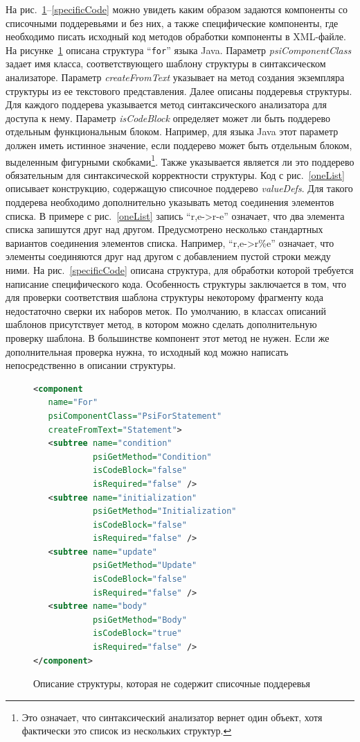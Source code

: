 На рис.~\ref{noLists}--\ref{specificCode} можно увидеть каким образом задаются компоненты со списочными поддеревьями и без них, а также специфические компоненты, где необходимо писать исходный код методов обработки компоненты в XML-файле. На рисунке~\ref{noLists} описана структура ``\lstinline{for}'' языка Java. Параметр \textit{psiComponentClass} задает имя класса, соответствующего шаблону структуры в синтаксическом анализаторе. Параметр \textit{createFromText} указывает на метод создания экземпляра структуры из ее текстового представления. Далее описаны поддеревья структуры. Для каждого поддерева указывается метод синтаксического анализатора для доступа к нему. Параметр \textit{isCodeBlock} определяет может ли быть поддерево отдельным функциональным блоком. Например, для языка Java этот параметр должен иметь истинное значение, если поддерево может быть отдельным блоком, выделенным фигурными скобками\footnote{Это означает, что синтаксический анализатор вернет один объект, хотя фактически это список из нескольких структур.}. Также указывается является ли это поддерево обязательным для синтаксической корректности структуры. Код с рис.~\ref{oneList} описывает конструкцию, содержащую списочное поддерево \textit{valueDefs}. Для такого поддерева необходимо дополнительно указывать метод соединения элементов списка. В примере с рис.~\ref{oneList} запись ``r,e->r-e'' означает, что два элемента списка запишутся друг над другом. Предусмотрено несколько стандартных вариантов соединения элементов списка. Например, ``r,e->r\%e'' означает, что элементы соединяются друг над другом с добавлением пустой строки между ними. На рис.~\ref{specificCode} описана структура, для обработки которой требуется написание специфического кода. Особенность структуры заключается в том, что для проверки соответствия шаблона структуры некоторому фрагменту кода недостаточно сверки их наборов меток. По умолчанию, в классах описаний шаблонов присутствует метод, в котором можно сделать дополнительную проверку шаблона. В большинстве компонент этот метод не нужен. Если же дополнительная проверка нужна, то исходный код можно написать непосредственно в описании структуры.

\begin{figure}[t]
    \begin{lstlisting}[language=xml,basicstyle=\scriptsize]
<component 
   name="For"
   psiComponentClass="PsiForStatement" 
   createFromText="Statement">
   <subtree name="condition"       
            psiGetMethod="Condition"
            isCodeBlock="false"    
            isRequired="false" />
   <subtree name="initialization"  
            psiGetMethod="Initialization"
            isCodeBlock="false"    
            isRequired="false" />
   <subtree name="update"          
            psiGetMethod="Update"
            isCodeBlock="false"    
            isRequired="false" />
   <subtree name="body"            
            psiGetMethod="Body"
            isCodeBlock="true"     
            isRequired="false" />
</component>
    \end{lstlisting}
\caption{Описание структуры, которая не содержит списочные поддеревья}    
\label{noLists}
\end{figure}

